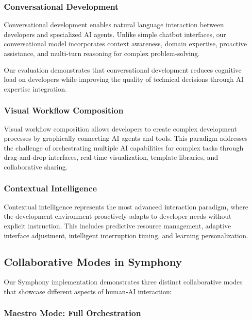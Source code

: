 \subsubsection{Conversational Development}

Conversational development enables natural language interaction between developers and specialized AI agents. Unlike simple chatbot interfaces, our conversational model incorporates context awareness, domain expertise, proactive assistance, and multi-turn reasoning for complex problem-solving.

Our evaluation demonstrates that conversational development reduces cognitive load on developers while improving the quality of technical decisions through AI expertise integration.

\subsubsection{Visual Workflow Composition}

Visual workflow composition allows developers to create complex development processes by graphically connecting AI agents and tools. This paradigm addresses the challenge of orchestrating multiple AI capabilities for complex tasks through drag-and-drop interfaces, real-time visualization, template libraries, and collaborative sharing.

\subsubsection{Contextual Intelligence}

Contextual intelligence represents the most advanced interaction paradigm, where the development environment proactively adapts to developer needs without explicit instruction. This includes predictive resource management, adaptive interface adjustment, intelligent interruption timing, and learning personalization.

\subsection{Collaborative Modes in Symphony}

Our Symphony implementation demonstrates three distinct collaborative modes that showcase different aspects of human-AI interaction:

\subsubsection{Maestro Mode: Full Orchestration}

